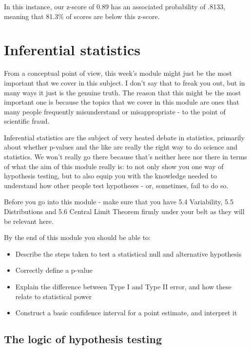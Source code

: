 \documentclass[
]{book}
\providecommand{\tightlist}{%
  \setlength{\itemsep}{0pt}\setlength{\parskip}{0pt}}
\begin{document}
In this instance, our z-score of 0.89 has an associated probability of .8133, meaning that 81.3\% of scores are below this z-score.

\hypertarget{inferential-statistics}{%
\chapter{Inferential statistics}\label{inferential-statistics}}

From a conceptual point of view, this week's module might just be the most important that we cover in this subject. I don't say that to freak you out, but in many ways it just is the genuine truth. The reason that this might be the most important one is because the topics that we cover in this module are ones that many people frequently misunderstand or misappropriate - to the point of scientific fraud.

Inferential statistics are the subject of very heated debate in statistics, primarily about whether p-values and the like are really the right way to do science and statistics. We won't really go there because that's neither here nor there in terms of what the aim of this module really is: to not only show you one way of hypothesis testing, but to also equip you with the knowledge needed to understand how other people test hypotheses - or, sometimes, fail to do so.

Before you go into this module - make sure that you have 5.4 Variability, 5.5 Distributions and 5.6 Central Limit Theorem firmly under your belt as they will be relevant here.

By the end of this module you should be able to:

\begin{itemize}
\tightlist
\item
  Describe the steps taken to test a statistical null and alternative hypothesis
\item
  Correctly define a p-value
\item
  Explain the difference between Type I and Type II error, and how these relate to statistical power
\item
  Construct a basic confidence interval for a point estimate, and interpret it
\end{itemize}

\hypertarget{the-logic-of-hypothesis-testing}{%
\section{The logic of hypothesis testing}\label{the-logic-of-hypothesis-testing}}
\end{document}
